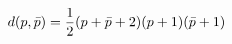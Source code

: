 \begin{equation}
d(p,\bar p)={1\over 2}(p+\bar p +2)(p+1)(\bar p+1)
\label{SU3dimension}
\end{equation}

